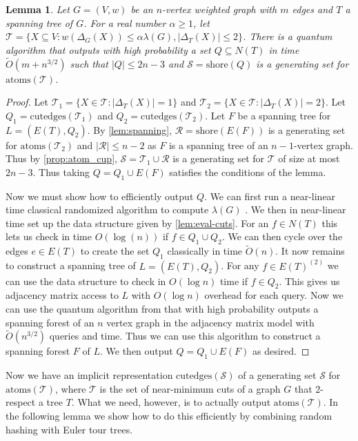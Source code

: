 \documentclass[10pt,a4paper]{article}
\newcommand{\Rcal}{\mathcal{R}}
\newcommand{\Scal}{\mathcal{S}}
\newcommand{\Tcal}{\mathcal{T}}
\newcommand{\atoms}{\mathrm{atoms}}
\newcommand{\shore}{\mathrm{shore}}
\newcommand{\edges}{\mathrm{cutedges}}
\newcommand{\tO}{\tilde O}
\newcommand{\1}{\mathbf{1}}
\newtheorem{lemma}[theorem]{Lemma}
\theoremstyle{definition}
\begin{document}
\begin{lemma}
\label{lem:q_genset}
Let $G = (V,w)$ be an $n$-vertex weighted graph with $m$ edges and $T$ a spanning tree of $G$.  For a real number 
$\alpha \ge 1$, let $\Tcal = \{X \subseteq V: w(\Delta_G(X)) \le \alpha \lambda(G), |\Delta_T(X)| \le 2\}$.  
There is a quantum algorithm that outputs with high probability a set $Q \subseteq N(T)$ in time $\tO(m + n^{3/2})$ such that $|Q| \le 2n-3$ and $\Scal = \shore(Q)$
is a generating set for $\atoms(\Tcal)$.  
\end{lemma}

\begin{proof}
Let $\Tcal_1 = \{X \in \Tcal: |\Delta_T(X)| =1\}$ and $\Tcal_2 = \{X \in \Tcal: |\Delta_T(X)| =2\}$. Let $Q_1 = \edges(\Tcal_1)$ and $Q_2 = \edges(\Tcal_2)$.  
Let $F$ be a spanning tree for $L = (E(T), Q_2)$.  By \cref{lem:spanning}, $\Rcal = \shore(E(F))$ is a generating set for 
$\atoms(\Tcal_2)$ and $|\Rcal| \le n-2$ as $F$ is a spanning tree of an $n-1$-vertex graph.  Thus by \cref{prop:atom_cup}, $\Scal = \Tcal_1 \cup \Rcal$ is a generating set for $\Tcal$ of size at most $2n-3$.  
Thus taking $Q = Q_1 \cup E(F)$ satisfies the conditions of the lemma.

Now we must show how to efficiently output $Q$.  We can first run a near-linear time classical randomized algorithm to compute $\lambda(G)$ \cite{Karger00}.  We then in near-linear time set up the 
data structure given by \cref{lem:eval-cuts}.  For an $f \in N(T)$ this lets us check in time $O(\log(n))$ if $f \in Q_1 \cup Q_2$.  We can then cycle over the edges $e\in E(T)$ to create the set $Q_1$ classically in time 
$\tO(n)$.  It now remains to construct a spanning tree of $L = (E(T), Q_2)$.
For any $f \in E(T)^{(2)}$ we can use the data structure to check in $O(\log n)$ time if $f \in Q_2$.
This gives us adjacency matrix access to $L$ with $O(\log n)$ overhead for each query.  
Now we can use the quantum algorithm from \cite{DHHM06} that with high probability outputs a spanning forest of an $n$ vertex graph in the adjacency matrix model with $\tO(n^{3/2})$  queries and time.  
Thus we can use this algorithm to construct a spanning forest $F$ of $L$.  We then output $Q = Q_1 \cup E(F)$ as desired.
\end{proof}

Now we have an implicit representation $\edges(\Scal)$ of a generating set $\Scal$ for $\atoms(\Tcal)$, where $\Tcal$ is the set of near-minimum cuts of a graph $G$ that 2-respect a tree $T$.  
What we need, however, is to actually output $\atoms(\Tcal)$.
In the following lemma we show how to do this efficiently by combining random hashing with Euler tour trees.
\end{document}

